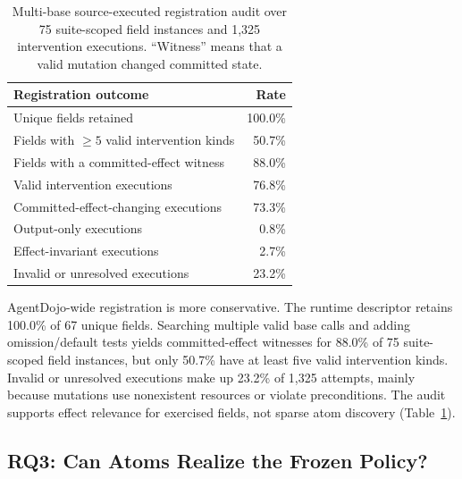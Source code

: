 \documentclass[letterpaper,twocolumn,10pt]{article}
\theoremstyle{definition}
\begin{document}
\begin{table}[t]
\centering
\small
\setlength{\tabcolsep}{4pt}
\caption{Multi-base source-executed registration audit over 75 suite-scoped
field instances and 1,325 intervention executions. ``Witness'' means that a
valid mutation changed committed state.}
\label{tab:registration-sufficiency}
\begin{tabular}{lr}
\toprule
Registration outcome & Rate \\
\midrule
Unique fields retained & 100.0\% \\
Fields with $\geq 5$ valid intervention kinds & 50.7\% \\
Fields with a committed-effect witness & 88.0\% \\
Valid intervention executions & 76.8\% \\
Committed-effect-changing executions & 73.3\% \\
Output-only executions & 0.8\% \\
Effect-invariant executions & 2.7\% \\
Invalid or unresolved executions & 23.2\% \\
\bottomrule
\end{tabular}
\end{table}


AgentDojo-wide registration is more conservative.  The runtime descriptor
retains 100.0\% of 67 unique fields.  Searching multiple
valid base calls and adding omission/default tests yields committed-effect
witnesses for 88.0\% of 75 suite-scoped field instances, but only 50.7\% have
at least five valid intervention kinds.  Invalid or unresolved executions make
up 23.2\% of 1,325 attempts, mainly because mutations use nonexistent resources
or violate preconditions.  The audit supports effect relevance for exercised
fields, not sparse atom discovery (Table~\ref{tab:registration-sufficiency}).

\subsection{RQ3: Can Atoms Realize the Frozen Policy?}
\end{document}
